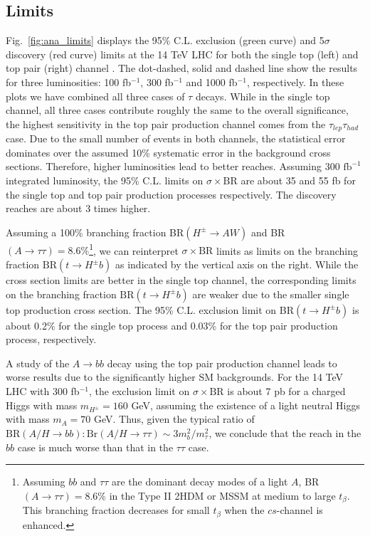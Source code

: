 \subsection{Limits}
\label{sec:ana_limits}

Fig.~\ref{fig:ana_limits} displays the 95\% C.L. exclusion (green curve) and 5$\sigma$ discovery (red curve) limits at the 14 TeV LHC for both the single top (left) and top pair (right) channel . The dot-dashed, solid and dashed line show the results for three luminosities: 100 fb$^{-1}$, 300 fb$^{-1}$ and 1000 fb$^{-1}$, respectively. In these plots we have combined all three cases of $\tau$ decays. While in the single top channel, all three cases contribute roughly the same to the overall significance, the highest sensitivity in the top pair production channel comes from the $\tau_{lep}\tau_{had}$ case. Due to the small number of events in both channels, the statistical error dominates over the assumed 10\% systematic error in the background cross sections. Therefore, higher luminosities lead to better reaches. Assuming 300 $\text{fb}^{-1}$ integrated luminosity, the 95\% C.L. limits on $\sigma\times\text{BR}$ are about 35 and 55 fb for the single top and top pair production processes respectively. The discovery reaches are about 3 times higher. 

Assuming a 100\% branching fraction BR$(H^{\pm} \rightarrow A W )$ and BR$(A \rightarrow \tau\tau)=8.6\%$\footnote{Assuming $bb$ and $\tau\tau$ are the dominant decay modes of a light $A$, BR$(A \rightarrow \tau\tau)=8.6$\% in the Type II 2HDM or MSSM at medium to large $t_{\beta}$. This branching fraction decreases for small $t_{\beta}$ when the $cs$-channel is enhanced.}, we can reinterpret $\sigma\times\text{BR}$ limits as limits on the branching fraction $\text{BR}(t \rightarrow H^{\pm} b)$ as indicated by the vertical axis on the right. While the cross section limits are better in the single top channel, the corresponding limits on the branching fraction $\text{BR}(t \rightarrow H^{\pm} b)$ are weaker due to the smaller single top production cross section. The 95\% C.L. exclusion limit on BR$(t \rightarrow H^{\pm} b)$ is about 0.2\% for the single top process and 0.03\% for the top pair production process, respectively.

A study of the $A \rightarrow bb$ decay using the top pair production channel leads to worse results due to the significantly higher SM backgrounds. For the 14 TeV LHC with 300 fb$^{-1}$, the exclusion limit on $\sigma \times \text{BR}$ is about 7 pb for a charged Higgs with mass $m_{H^{\pm}} = 160$ GeV, assuming the existence of a light neutral Higgs with mass $m_A=70$ GeV. Thus, given the typical ratio of $\text{BR}(A/H \rightarrow bb) : \text{Br}(A/H\rightarrow \tau\tau) \sim 3m^2_b/m^2_{\tau}$, we conclude that the reach in the $bb$ case is much worse than that in the $\tau\tau$ case.

